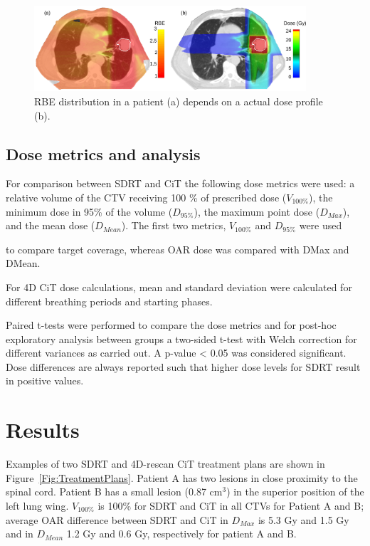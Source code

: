 \documentclass[type=dr, dr=rernat, acm$^3$entcolor=tud7b,colorbacktitle, bigchapter, openright, twoside, 12pt ]{tudthesis}
\begin{document}
\begin{figure}[H]
\begin{center}
\includegraphics[width=0.9\textwidth]{./Images/RBE.png}
\caption{RBE distribution in a patient (a) depends on a actual dose profile (b).}
\label{Fig:RBE}
\end{center}
\end{figure}

\subsection{Dose metrics and analysis}


For comparison between SDRT and CiT the following dose metrics were used: a relative volume of the CTV receiving 100 \% of prescribed dose ($V_{100\%}$), 
the minimum dose in 95\% of the volume ($D_{95\%}$), the maximum point dose ($D_{Max}$), and the mean dose ($D_{Mean}$). The first two metrics, $V_{100\%}$ and $D_{95\%}$ were used 

to compare target coverage, whereas OAR dose was compared with DMax and DMean.

For 4D CiT dose calculations, mean and standard deviation were calculated for different breathing periods and starting phases.

Paired t-tests were performed to compare the dose metrics and for post-hoc exploratory analysis between groups a two-sided t-test with Welch correction for different variances
as carried out. A p-value < 0.05 was considered significant. Dose differences are always reported such that higher dose levels for SDRT result in positive values.

\section{Results}

Examples of two SDRT and 4D-rescan CiT treatment plans are shown in Figure~\ref{Fig:TreatmentPlans}. Patient A has two lesions in close proximity to the spinal cord. 
Patient B has a small lesion (0.87 cm$^3$) in the superior position of the left lung wing. $V_{100\%}$ is 100\% for SDRT and CiT in all CTVs for Patient A and B; 
average OAR difference between SDRT and CiT in $D_{Max}$ is 5.3 Gy and 1.5 Gy and in $D_{Mean}$ 1.2 Gy and 0.6 Gy, respectively for patient A and B.
\end{document}
